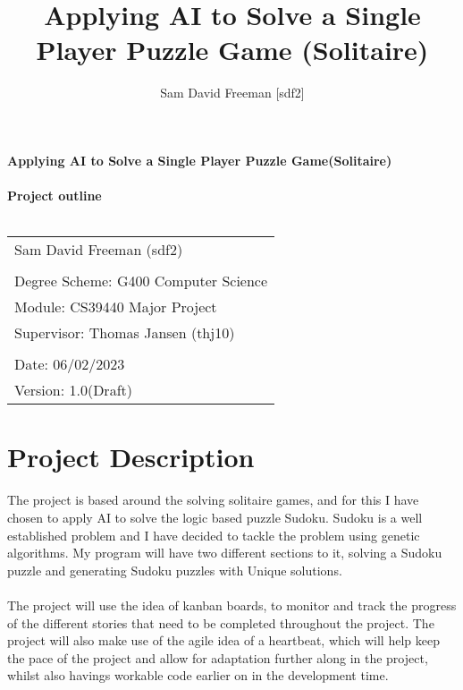 \documentclass[a4paper,10pt]{article}
\title{Applying AI to Solve a Single Player Puzzle Game (Solitaire)}
\author{Sam David Freeman [sdf2]}
\begin{document}
	\begin{titlepage}
		
		\noindent\LARGE\textbf{Applying AI to Solve a Single Player Puzzle Game(Solitaire)}\\ \\ 
		\Large \textbf{Project outline}\\ \\ 
		\normalsize
		\begin{center}
			\begin{table}[H]
				\begin{tabular}{l}
					Sam David Freeman (sdf2) \\
					\\
					Degree Scheme: G400 Computer Science    \\
					Module: CS39440 Major Project    \\
					Supervisor: Thomas Jansen (thj10)    \\
					                          \\
					Date: 06/02/2023               \\
					Version: 1.0(Draft)              
				\end{tabular}
			\end{table}
		\end{center}

	\end{titlepage}

\newpage
\section*{Project Description}
The project is based around the solving solitaire games, and for this I have chosen to apply AI to solve the logic based puzzle Sudoku. Sudoku is a well established problem and I have decided to tackle the problem using genetic algorithms. My program will have two different sections to it, solving a Sudoku puzzle and generating Sudoku puzzles with Unique solutions. \\ \\
The project will use the idea of kanban boards, to monitor and track the progress of the different stories that need to be completed throughout the project. The project will also make use of the agile idea of a heartbeat, which will help keep the pace of the project and allow for adaptation further along in the project, whilst also havings workable code earlier on in the development time. 
\end{document}
